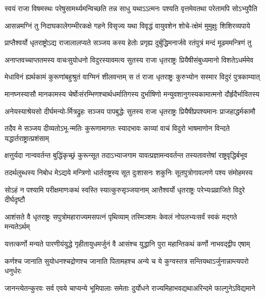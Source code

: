 \twolineshloka
{स्वयं राजा विषमस्थः परेषुसामर्थ्यमन्विच्छति तन्न साधु}
{यथाऽऽत्मनः पश्यति वृत्तमेवतथा परेतामपि सोऽभ्युपैति}


\twolineshloka
{आसन्नमग्निं तु निदाघकालेगम्भीरकक्षे गहने विसृज्य}
{यथा विवृद्धं वायुवशेन शोचे-त्क्षेमं मुमुक्षुः शिशिरव्यपाये}


\twolineshloka
{प्राप्तैश्वर्यो धृतराष्ट्रोऽद्य राजालालप्यते सञ्जय कस्य हेतोः}
{प्रगृह्य दुर्बुद्धिमनार्जवे रतंपुत्रं मन्दं मूढममन्त्रिणं तु}


\twolineshloka
{अनाप्तवच्चाप्ततमस्य वाचःसुयोधनो विदुरस्यावमत्य}
{सुतस्य राजा धृतराष्ट्रः प्रियैषीसंबुध्यमानो विशतेऽधर्ममेव}


\twolineshloka
{मेधाविनं ह्यर्थकामं कुरूणांबहुश्रुतं वाग्मिनं शीलवन्तम्}
{स तं राजा धृतराष्ट्रः कुरुभ्योन सस्मार विदुरं पुत्रकाम्यात्}


\twolineshloka
{मानघ्नस्यासौ मानकामस्य चेर्षोःसंरम्भिणश्चार्थधर्मातिगस्य}
{दुर्भाषिणो मन्युवशानुगस्यकामात्मनो दौर्हृदैर्भावितस्य}


\twolineshloka
{अनेयस्याश्रेयसो दीर्घमन्यो-र्मित्रद्रुहः सञ्जय पापबुद्धेः}
{सुतस्य राजा धृतराष्ट्रः प्रियैषीप्रपश्यमानः प्राजहाद्धर्मकामौ}


\twolineshloka
{तदैव मे सञ्जय दीव्यतोऽभू-न्मतिः कुरूणामागतः स्यादभावः}
{काव्यां वाचं विदुरो भाषमाणोन विन्दते यद्धार्तराष्ट्रात्प्रशंसाम्}


\twolineshloka
{क्षत्तुर्यदा नान्ववर्तन्त बुद्धिंकृच्छ्रं कुरून्सूत तदाऽभ्याजगाम}
{यावत्प्रज्ञामन्ववर्तन्त तस्यतावत्तेषां राष्ट्रवृद्धिर्बभूव}


\twolineshloka
{तदर्थलुब्धस्य निबोध मेऽद्यये मन्त्रिणो धार्तराष्ट्रस्य सूत}
{दुःशासनः शकुनिः सूतपुत्रोगावल्गणे पश्य संमोहमस्य}


\twolineshloka
{सोऽहं न पश्यामि परीक्षमाणःकथं स्वस्ति स्यात्कुरुसृञ्जयानाम्}
{आत्तैश्वर्यो धृतराष्ट्रः परेभ्यःप्रव्राजिते विदुरे दीर्घदृष्टौ}


\twolineshloka
{आशंसते वै धृतराष्ट्रः सपुत्रोमहाराज्यमसपत्नं पृथिव्याम्}
{तस्मिञ्शमः केवलं नोपलभ्यःसर्वं स्वकं मद्गते मन्यतेऽर्थम्}


\twolineshloka
{यत्तत्कर्णो मन्यते पारणीयंयुद्धे गृहीतायुधमर्जुनं वै}
{आसंश्च युद्धानि पुरा महान्तिकथं कर्णो नाभवद्द्वीप एषाम्}


\twolineshloka
{कर्णश्च जानाति सुयोधनश्चद्रोणश्च जानाति पितामहश्च}
{अन्ये च ये कुग्वस्तत्र सन्तियथाऽर्जुनान्नाम्त्यपरो धनुर्धरः}


\twolineshloka
{जानन्त्येतन्कुरवः सर्व एवये चाप्यन्ये भूमिपालाः समेताः}
{दुर्योधने राज्यमिहाभवद्यथाअरिन्दमे फाल्गुनेऽविद्यमाने}


